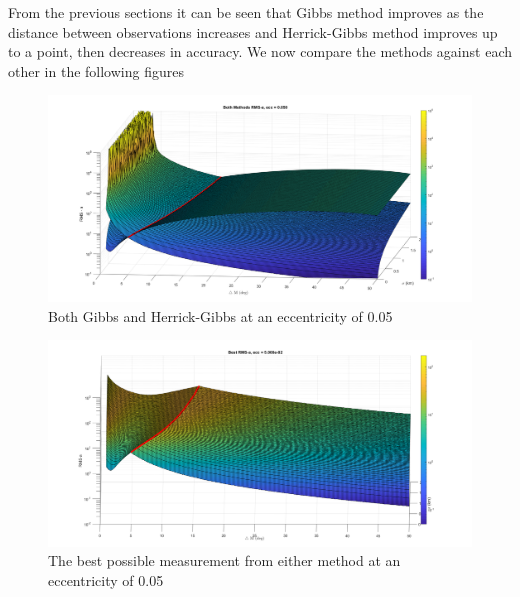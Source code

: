 \documentclass[12pt]{article}
\begin{document}
	From the previous sections it can be seen  that Gibbs method improves as the distance between observations increases and Herrick-Gibbs method improves up to a point, then decreases in accuracy. We now compare the methods against each other in the following figures 
	\begin{figure}
		\centering
		\includegraphics[width=0.7\linewidth]{bothMethods_e_05}
		\caption{Both Gibbs and Herrick-Gibbs at an eccentricity of 0.05}
		\label{fig:bothmethodse05}
	\end{figure}
	\begin{figure}
		\centering
		\includegraphics[width=0.7\linewidth]{bestMethods_e_05}
		\caption{The best possible measurement from either method at an eccentricity of 0.05}
		\label{fig:bestmethodse05}
	\end{figure}
\end{document}
